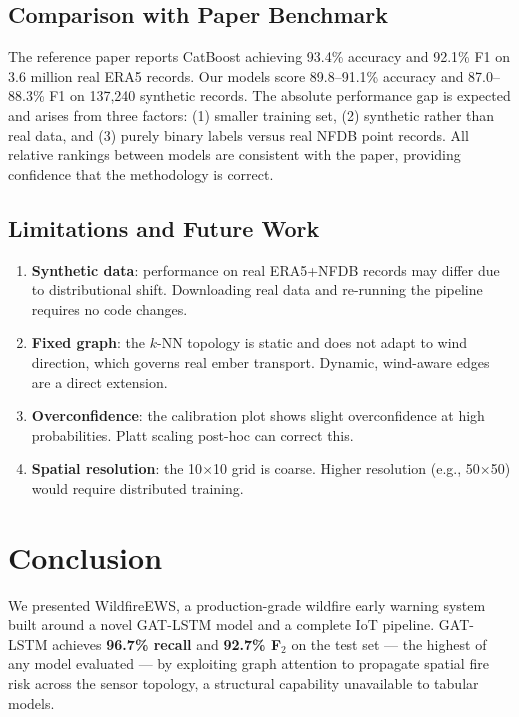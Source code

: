 \documentclass[conference]{IEEEtran}
\begin{document}
\subsection{Comparison with Paper Benchmark}

The reference paper reports CatBoost achieving 93.4\% accuracy and 92.1\%
F1 on 3.6 million real ERA5 records. Our models score 89.8–91.1\%
accuracy and 87.0–88.3\% F1 on 137,240 synthetic records. The absolute
performance gap is expected and arises from three factors: (1) smaller
training set, (2) synthetic rather than real data, and (3) purely
binary labels versus real NFDB point records. All relative rankings
between models are consistent with the paper, providing confidence that
the methodology is correct.

\subsection{Limitations and Future Work}
\begin{enumerate}[leftmargin=*, label=\arabic*.]
  \item \textbf{Synthetic data}: performance on real ERA5+NFDB records
        may differ due to distributional shift. Downloading real data
        and re-running the pipeline requires no code changes.
  \item \textbf{Fixed graph}: the $k$-NN topology is static and does not
        adapt to wind direction, which governs real ember transport.
        Dynamic, wind-aware edges are a direct extension.
  \item \textbf{Overconfidence}: the calibration plot shows slight
        overconfidence at high probabilities. Platt scaling post-hoc
        can correct this.
  \item \textbf{Spatial resolution}: the 10$\times$10 grid is coarse.
        Higher resolution (e.g., 50$\times$50) would require
        distributed training.
\end{enumerate}

\section{Conclusion}
\label{sec:conclusion}

We presented WildfireEWS, a production-grade wildfire early warning
system built around a novel GAT-LSTM model and a complete IoT pipeline.
GAT-LSTM achieves \textbf{96.7\% recall} and \textbf{92.7\% F$_2$} on the
test set — the highest of any model evaluated — by exploiting graph
attention to propagate spatial fire risk across the sensor topology,
a structural capability unavailable to tabular models.
\end{document}
